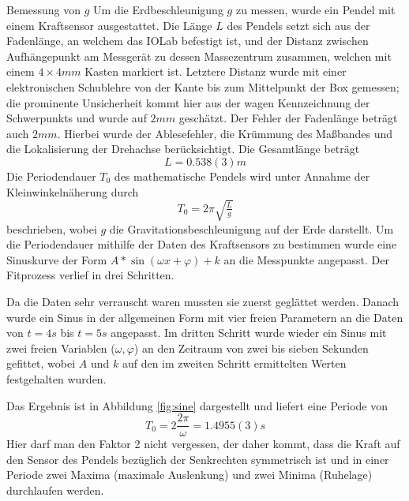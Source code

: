 \documentclass{alex_gp}
\begin{document}
\begin{mybox}{Bemessung von \( g \)}
	Um die Erdbeschleunigung \( g \) zu messen, wurde ein Pendel mit einem Kraftsensor ausgestattet. Die Länge \( L \) des Pendels setzt sich aus der Fadenlänge, an welchem das IOLab befestigt ist, und der Distanz zwischen Aufhängepunkt am Messgerät zu dessen Massezentrum zusammen, welchen mit einem \( 4\times 4 \unit{mm} \) Kasten markiert ist. Letztere Distanz wurde mit einer elektronischen Schublehre von der Kante bis zum Mittelpunkt der Box gemessen; die prominente Unsicherheit kommt hier aus der wagen Kennzeichnung der Schwerpunkts und wurde auf \( 2 \unit{mm} \) geschätzt. Der Fehler der Fadenlänge beträgt auch \( 2 \unit{mm} \). Hierbei wurde der Ablesefehler, die Krümmung des Maßbandes und die Lokalisierung der Drehachse berücksichtigt. Die Gesamtlänge beträgt 
	\begin{equation}
		L = 0.538(3) \unit{m}
	\end{equation}
	Die Periodendauer \( T_0 \) des mathematische Pendels wird unter Annahme der Kleinwinkelnäherung durch 
	\begin{equation}\label{eqn:T0}
		T_0 = 2\pi\sqrt{\tfrac{L}{g}}
	\end{equation}
	beschrieben, wobei \( g \) die Gravitationsbeschleunigung auf der Erde darstellt. Um die Periodendauer mithilfe der Daten des Kraftsensors zu bestimmen wurde eine Sinuskurve der Form \( A * \sin(\omega x + \varphi) + k \) an die Messpunkte angepasst. Der Fitprozess verlief in drei Schritten.\par 
	Da die Daten sehr verrauscht waren mussten sie zuerst geglättet werden. Danach wurde ein Sinus in der allgemeinen Form mit vier freien Parametern an die Daten von \( t = 4 \unit{s} \) bis \( t = 5 \unit{s} \) angepasst. Im dritten Schritt wurde wieder ein Sinus mit zwei freien Variablen (\( \omega, \varphi \)) an den Zeitraum von zwei bis sieben Sekunden gefittet, wobei \( A \) und \( k \) auf den im zweiten Schritt ermittelten Werten festgehalten wurden. \par 
	Das Ergebnis ist in Abbildung \ref{fig:sine} dargestellt und liefert eine Periode von
	\begin{equation}\label{eqn:period}
		T_0 = 2 \frac{2\pi}{\omega} = 1.4955(3) \unit{s}
	\end{equation}
	Hier darf man den Faktor 2 nicht vergessen, der daher kommt, dass die Kraft auf den Sensor des Pendels bezüglich der Senkrechten symmetrisch ist und in einer Periode zwei Maxima (maximale Auslenkung) und zwei Minima (Ruhelage) durchlaufen werden.

\end{mybox}
\end{document}
